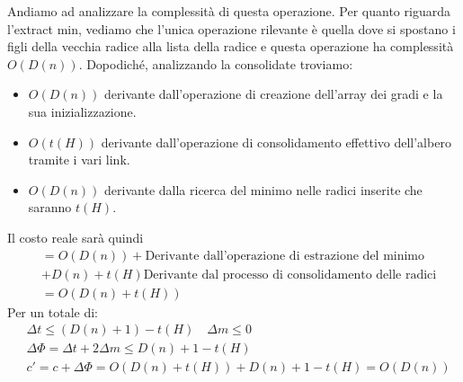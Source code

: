 Andiamo ad analizzare la complessità di questa operazione. Per quanto riguarda l'extract min, vediamo che l'unica operazione rilevante è quella dove si spostano i figli della vecchia radice alla lista della radice e questa operazione ha complessità $O(D(n))$. 
Dopodiché, analizzando la consolidate troviamo:
\begin{itemize}
    \item $O(D(n))$ derivante dall'operazione di creazione dell'array dei gradi e la sua inizializzazione.
    \item $O(t(H))$ derivante dall'operazione di consolidamento effettivo dell'albero tramite i vari link.
    \item $O(D(n))$ derivante dalla ricerca del minimo nelle radici inserite che saranno $t(H)$.
\end{itemize}
Il costo reale sarà quindi
\begin{align*}
    &=O(D(n)) + \text{Derivante dall'operazione di estrazione del minimo}\\
    &+ D(n) + t(H) \text{Derivante dal processo di consolidamento delle radici}\\
    &= O(D(n)+t(H))
\end{align*}
Per un totale di:
\begin{align*}
    &\Delta t \leq (D(n)+1)-t(H) \quad \Delta m \leq 0\\
    &\Delta \Phi = \Delta t + 2 \Delta m \leq D(n)+1-t(H)\\
    &c' = c+\Delta \Phi = O(D(n)+t(H))+D(n)+1-t(H) = O(D(n))
\end{align*}
